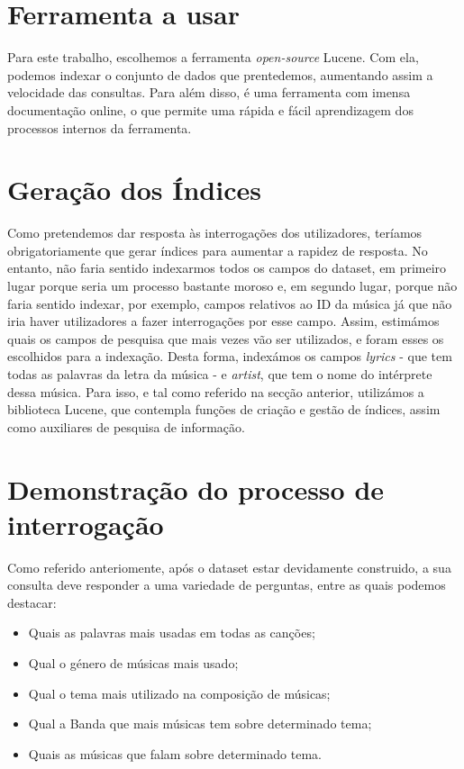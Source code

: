 \documentclass[twocolumn,twoside,10pt,a4paper]{article}
\begin{document}
\section{Ferramenta a usar}\label{sec:ferramenta}

Para este trabalho, escolhemos a ferramenta \textit{open-source} Lucene. Com ela, podemos indexar o conjunto de dados que prentedemos, aumentando assim a velocidade das consultas. Para além disso, é uma ferramenta com imensa documentação online, o que permite uma rápida e fácil aprendizagem dos processos internos da ferramenta.

\section{Geração dos Índices}\label{sec:indices}

Como pretendemos dar resposta às interrogações dos utilizadores, teríamos obrigatoriamente que gerar índices para aumentar a rapidez de resposta. No entanto, não faria sentido indexarmos todos os campos do dataset, em primeiro lugar porque seria um processo bastante moroso e, em segundo lugar, porque não faria sentido indexar, por exemplo, campos relativos ao ID da música já que não iria haver utilizadores a fazer interrogações por esse campo. Assim, estimámos quais os campos de pesquisa que mais vezes vão ser utilizados, e foram esses os escolhidos para a indexação. Desta forma, indexámos os campos \textit{lyrics} - que tem todas as palavras da letra da música - e \textit{artist}, que tem o nome do intérprete dessa música. Para isso, e tal como referido na secção anterior, utilizámos a biblioteca Lucene, que contempla funções de criação e gestão de índices, assim como auxiliares de pesquisa de informação.


\section{Demonstração do processo de interrogação}\label{sec:demonstração}

Como referido anteriomente, após o dataset estar devidamente construido, a sua consulta deve responder a uma variedade de perguntas, entre as quais podemos destacar:

\begin{itemize}
	\item Quais as palavras mais usadas em todas as canções;
	\item Qual o género de músicas mais usado;
	\item Qual o tema mais utilizado na composição de músicas;
	\item Qual a Banda que mais músicas tem sobre determinado tema;
	\item Quais as músicas que falam sobre determinado tema.
\end{itemize}
\end{document}
